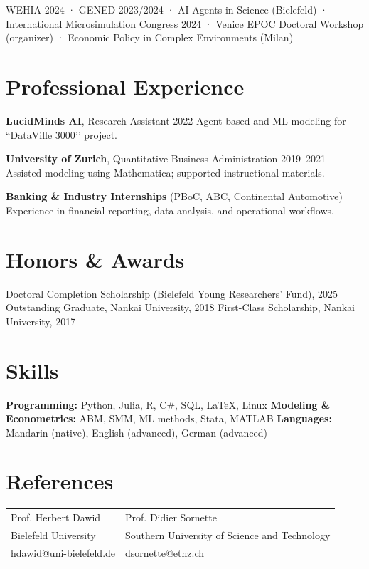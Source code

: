 \documentclass[a4paper,11pt]{article}
\begin{document}
WEHIA 2024 · GENED 2023/2024 · AI Agents in Science (Bielefeld) ·  
International Microsimulation Congress 2024 · Venice EPOC Doctoral Workshop (organizer) ·  
Economic Policy in Complex Environments (Milan)

\section{Professional Experience}

\textbf{LucidMinds AI}, Research Assistant \hfill 2022  
Agent-based and ML modeling for “DataVille 3000’’ project.

\textbf{University of Zurich}, Quantitative Business Administration \hfill 2019–2021  
Assisted modeling using Mathematica; supported instructional materials.

\textbf{Banking \& Industry Internships} (PBoC, ABC, Continental Automotive)  
Experience in financial reporting, data analysis, and operational workflows.

\section{Honors \& Awards}

Doctoral Completion Scholarship (Bielefeld Young Researchers’ Fund), 2025  
Outstanding Graduate, Nankai University, 2018  
First-Class Scholarship, Nankai University, 2017  

\section{Skills}

\textbf{Programming:} Python, Julia, R, C\#, SQL, LaTeX, Linux  
\textbf{Modeling \& Econometrics:} ABM, SMM, ML methods, Stata, MATLAB  
\textbf{Languages:} Mandarin (native), English (advanced), German (advanced)

\section{References}

\begin{tabularx}{\linewidth}{X X}
Prof. Herbert Dawid & Prof. Didier Sornette \\
Bielefeld University & Southern University of Science and Technology \\
\href{mailto:hdawid@uni-bielefeld.de}{hdawid@uni-bielefeld.de} &
\href{mailto:dsornette@ethz.ch}{dsornette@ethz.ch}
\end{tabularx}
\end{document}
